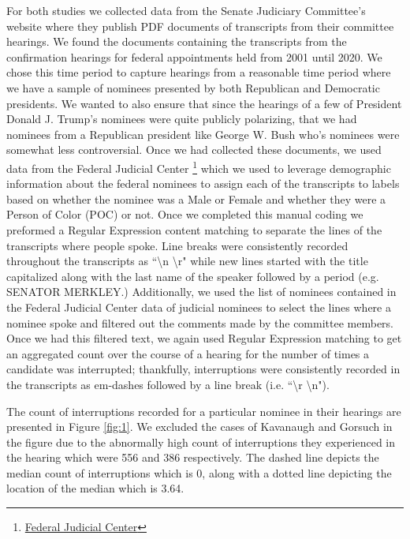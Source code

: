 \documentclass [12pt]{article}
\begin{document}
For both studies we collected data from the Senate Judiciary Committee's website where they publish PDF documents of transcripts from their committee hearings. We found the documents containing the transcripts from the confirmation hearings for federal appointments held from 2001 until 2020. We chose this time period to capture hearings from a reasonable time period where we have a sample of nominees presented by both Republican and Democratic presidents. We wanted to also ensure that since the hearings of a few of President Donald J. Trump's nominees were quite publicly polarizing, that we had nominees from a Republican president like George W. Bush who's nominees were somewhat less controversial. Once we had collected these documents, we used data from the Federal Judicial Center \footnote{\href{https://www.fjc.gov/}{Federal Judicial Center}} which we used to leverage demographic information about the federal nominees to assign each of the transcripts to labels based on whether the nominee was a Male or Female and whether they were a Person of Color (POC) or not. Once we completed this manual coding we preformed a Regular Expression content matching to separate the lines of the transcripts where people spoke. Line breaks were consistently recorded throughout the transcripts as ``\textbackslash n \textbackslash r" while new lines started with the title capitalized along with the last name of the speaker followed by a period (e.g. SENATOR MERKLEY.) Additionally, we used the list of nominees contained in the Federal Judicial Center data of judicial nominees to select the lines where a nominee spoke and filtered out the comments made by the committee members. Once we had this filtered text, we again used Regular Expression matching to get an aggregated count over the course of a hearing for the number of times a candidate was interrupted; thankfully, interruptions were consistently recorded in the transcripts as em-dashes followed by a line break (i.e. ``\textbackslash r \textbackslash n"). 
	
The count of interruptions recorded for a particular nominee in their hearings are presented in Figure \ref{fig:1}. We excluded the cases of Kavanaugh and Gorsuch in the figure due to the abnormally high count of interruptions they experienced in the hearing which were 556 and 386 respectively. The dashed line depicts the median count of interruptions which is 0, along with a dotted line depicting the location of the median which is 3.64.
	
\end{document}
